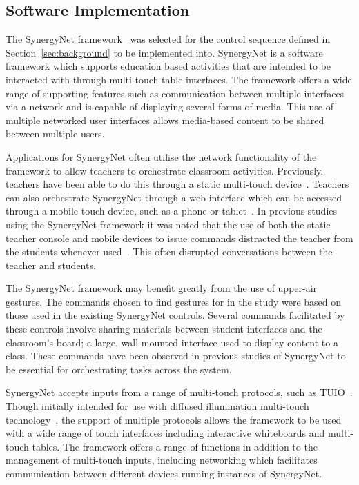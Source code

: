\documentclass[link]{IWCOMP}
\begin{document}

\subsection{Software Implementation}
\label{subsec:pilotStudyImplementation}


The SynergyNet framework~\cite{Higgins2011} was selected for the control sequence defined in Section~\ref{sec:background} to be implemented into.
SynergyNet is a software framework which supports education based activities that are intended to be interacted with through multi-touch table interfaces.
The framework offers a wide range of supporting features such as communication between multiple interfaces via a network and is capable of displaying several forms of media.
This use of multiple networked user interfaces allows media-based content to be shared between multiple users.

Applications for SynergyNet often utilise the network functionality of the framework to allow teachers to orchestrate classroom activities.
Previously, teachers have been able to do this through a static multi-touch device~\cite{AlAgha2010}.
Teachers can also orchestrate SynergyNet through a web interface which can be accessed through a mobile touch device, such as a phone or tablet~\cite{Mercier2013}.
In previous studies using the SynergyNet framework it was noted that the use of both the static teacher console and mobile devices to issue commands distracted the teacher from the students whenever used~\cite{Hatch2011,Mercier2013}.
This often disrupted conversations between the teacher and students.  

The SynergyNet framework may benefit greatly from the use of upper-air gestures. 
The commands chosen to find gestures for in the study were based on those used in the existing SynergyNet controls. 
Several commands facilitated by these controls involve sharing materials between student interfaces and the classroom's board; a large, wall mounted interface used to display content to a class.
These commands have been observed in previous studies of SynergyNet to be essential for orchestrating tasks across the system.

SynergyNet accepts inputs from a range of multi-touch protocols, such as TUIO~\cite{Kaltenbrunner2009}.
Though initially intended for use with diffused illumination multi-touch technology~\cite{Matsushita1997}, the support of multiple protocols allows the framework to be used with a wide range of touch interfaces including interactive whiteboards and multi-touch tables.
The framework offers a range of functions in addition to the management of multi-touch inputs, including networking which facilitates communication between different devices running instances of SynergyNet.
\end{document}

